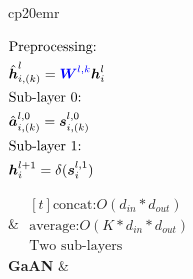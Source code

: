\begin{table}
\begin{footnotesize}
\begin{tabular}{cp{20em}r}
            \begin{scriptsize}
                $\begin{aligned}[t]
                         & \text{Preprocessing:}                                                                          \\
                         & \hat{\boldsymbol{h}}^{l}_{i,(k)} = \textcolor{blue}{\boldsymbol{W}^{l,k}} \boldsymbol{h}_i^{l} \\
                         & \text{Sub-layer 0:}                                                                            \\
                         & \hat{\boldsymbol{a}}^{l,0}_{i,(k)} = \boldsymbol{s}^{l,0}_{i,(k)}                              \\
                         & \text{Sub-layer 1:}                                                                            \\
                         & \boldsymbol{h}_i^{l+1} = \delta(\boldsymbol{s}_i^{l,1})
                    \end{aligned}
                $
            \end{scriptsize}                                                                                                                                                                                   &
            $
                \begin{aligned}[t]
                    \text{concat:} O(d_{in}*d_{out})    & \\
                    \text{average:} O(K*d_{in}*d_{out}) & \\
                    \text{Two sub-layers}               &
                \end{aligned}
            $
            \\
            \textbf{GaAN}  \cite{zhang2018_gaan}                                                                                                                                                               &
\end{tabular}
\end{footnotesize}
\end{table}
